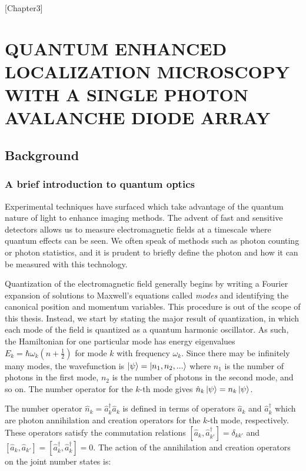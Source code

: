 [Chapter3]
\chapter{QUANTUM ENHANCED LOCALIZATION MICROSCOPY WITH A SINGLE PHOTON AVALANCHE DIODE ARRAY}

\section{Background}

\subsection{A brief introduction to quantum optics}

Experimental techniques have surfaced which take advantage of the quantum nature of light to enhance imaging methods. The advent of fast and sensitive detectors allows us to measure electromagnetic fields at a timescale where quantum effects can be seen. We often speak of methods such as photon counting or photon statistics, and it is prudent to briefly define the photon and how it can be measured with this technology.

Quantization of the electromagnetic field generally begins by writing a Fourier expansion of solutions to Maxwell's equations called \emph{modes} and identifying the canonical position and momentum variables. This procedure is out of the scope of this thesis. Instead, we start by stating the major result of quantization, in which each mode of the field is quantized as a quantum harmonic oscillator. As such, the Hamiltonian for one particular mode has energy eigenvalues $E_{k} = \hbar\omega_{k}(n + \frac{1}{2})$ for mode $k$ with frequency $\omega_{k}$. Since there may be infinitely many modes, the wavefunction is $\ket{\psi} = \ket{n_{1},n_{2},...}$ where $n_1$ is the number of photons in the first mode, $n_2$ is the number of photons in the second mode, and so on. The number operator for the $k$-th mode gives $\hat{n}_k\ket{\psi} = n_{k}\ket{\psi}$.

The number operator $\hat{n}_k = \hat{a}_k^\dagger\hat{a}_k$ is defined in terms of operators $\hat{a}_k$ and $\hat{a}_k^\dagger$ which are photon annihilation and creation operators for the $k$-th mode, respectively. These operators satisfy the commutation relations $[\hat{a}_k, \hat{a}_{k'}^\dagger] = \delta_{kk'}$ and $[\hat{a}_k, \hat{a}_{k'}] = [\hat{a}_k^\dagger, \hat{a}_k^\dagger] = 0$. The action of the annihilation and creation operators on the joint number states is:

